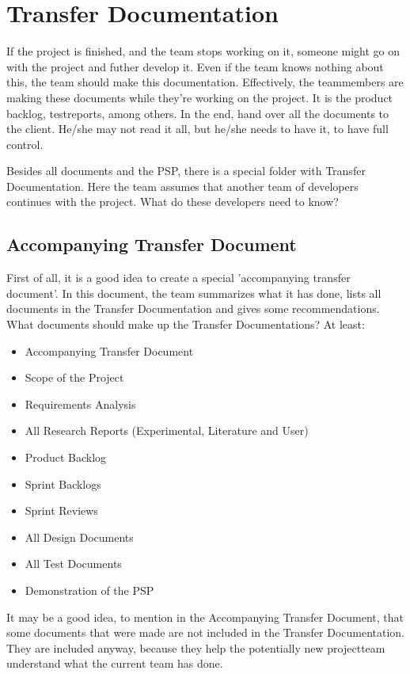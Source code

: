 \documentclass[10pt]{report}
\begin{document}
\newpage

% 
%

\section{Transfer Documentation}

If the project is finished, and the team stops working on it, someone might go on with the project and futher develop it. Even if the team knows nothing about this, the team should make this documentation. Effectively, the teammembers are making these documents while they're working on the project. It is the product backlog, testreports, among others. In the end, hand over all the documents to the client. He/she may not read it all, but he/she needs to have it, to have full control. 

Besides all documents and the PSP, there is a special folder with Transfer Documentation. Here the team assumes that another team of developers continues with the project. What do these developers need to know?

\subsection{Accompanying Transfer Document}

 First of all, it is a good idea to create a special 'accompanying transfer document'. In this document, the team summarizes what it has done, lists all documents in the Transfer Documentation and gives some recommendations. What documents should make up the Transfer Documentations? At least:

\begin{itemize}
	\item Accompanying Transfer Document
	\item Scope of the Project
	\item Requirements Analysis
	\item All Research Reports (Experimental, Literature and User)
	\item Product Backlog
	\item Sprint Backlogs
	\item Sprint Reviews
	\item All Design Documents
	\item All Test Documents
	\item Demonstration of the PSP
\end{itemize}

\noindent It may be a good idea, to mention in the Accompanying Transfer Document, that some documents that were made are not included in the Transfer Documentation. They are included anyway, because they help the potentially new projectteam understand what the current team has done.
\end{document}
